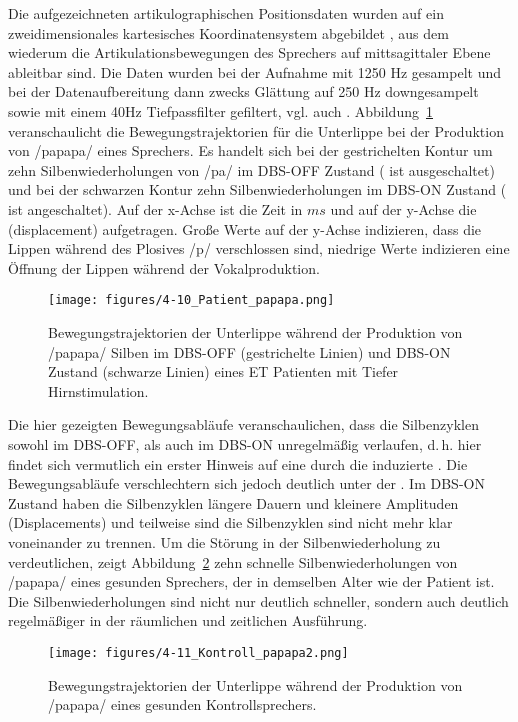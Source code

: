 Die aufgezeichneten artikulographischen Positionsdaten wurden auf ein zweidimensionales kartesisches Koordinatensystem abgebildet \citep[vgl.][]{Hoole1999}, aus dem wiederum die Artikulationsbewegungen des Sprechers auf mittsagittaler Ebene ableitbar sind. Die Daten wurden bei der Aufnahme mit 1250 Hz gesampelt und bei der Datenaufbereitung dann zwecks Glättung auf 250 Hz downgesampelt sowie mit einem 40Hz Tiefpassfilter gefiltert, vgl. auch \citet{Mücke2014a}. Abbildung~\ref{figure:0411} veranschaulicht die Bewegungstrajektorien für die Unterlippe bei der Produktion von /papapa/ eines Sprechers. Es handelt sich bei der gestrichelten Kontur um zehn Silbenwiederholungen von /pa/ im DBS-OFF Zustand ( ist ausgeschaltet) und bei der schwarzen Kontur zehn Silbenwiederholungen im DBS-ON Zustand ( ist angeschaltet). Auf der x-Achse ist die Zeit in $ms$ und auf der y-Achse die  (displacement) aufgetragen. Große Werte auf der y-Achse indizieren, dass die Lippen während des Plosives /p/ verschlossen sind, niedrige Werte indizieren eine Öffnung der Lippen während der Vokalproduktion.

\begin{figure}
	\texttt{[image: figures/4-10\_Patient\_papapa.png]}
	\caption{Bewegungstrajektorien der Unterlippe während der Produktion von /papapa/ Silben im DBS-OFF (gestrichelte Linien) und DBS-ON Zustand (schwarze Linien) eines ET Patienten mit Tiefer Hirnstimulation.}
	\label{figure:0411}
\end{figure}

Die hier gezeigten Bewegungsabläufe veranschaulichen, dass die Silbenzyklen sowohl im DBS-OFF, als auch im DBS-ON unregelmäßig verlaufen, d.\,h. hier findet sich vermutlich ein erster Hinweis auf eine durch die  induzierte . Die Bewegungsabläufe verschlechtern sich jedoch deutlich unter der . Im DBS-ON Zustand haben die Silbenzyklen längere Dauern und kleinere Amplituden (Displacements) und teilweise sind die Silbenzyklen sind nicht mehr klar voneinander zu trennen. Um die Störung in der Silbenwiederholung zu verdeutlichen, zeigt Abbildung~\ref{figure:0412} zehn schnelle Silbenwiederholungen von /papapa/ eines gesunden Sprechers, der in demselben Alter wie der Patient ist. Die Silbenwiederholungen sind nicht nur deutlich schneller, sondern auch deutlich regelmäßiger in der räumlichen und zeitlichen Ausführung.

\begin{figure}
	\texttt{[image: figures/4-11\_Kontroll\_papapa2.png]}
	\caption{Bewegungstrajektorien der Unterlippe während der Produktion von /papapa/ eines gesunden Kontrollsprechers.}
	\label{figure:0412}
\end{figure}

